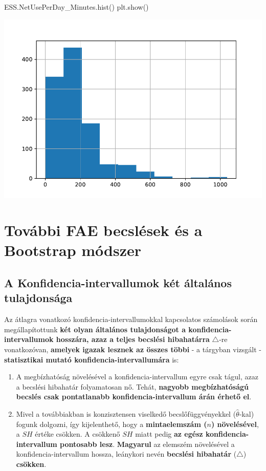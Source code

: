\documentclass[
]{book}
\newenvironment{Shaded}{\begin{snugshade}}{\end{snugshade}}
\newcommand{\NormalTok}[1]{#1}
\providecommand{\tightlist}{%
  \setlength{\itemsep}{0pt}\setlength{\parskip}{0pt}}
\begin{document}
\begin{Shaded}
\begin{Highlighting}[]
\NormalTok{ESS.NetUsePerDay\_Minutes.hist()}
\NormalTok{plt.show()}
\end{Highlighting}
\end{Shaded}

\includegraphics{_main_files/figure-latex/unnamed-chunk-283-13.pdf}

\chapter{További FAE becslések és a Bootstrap módszer}\label{tovuxe1bbi-fae-becsluxe9sek-uxe9s-a-bootstrap-muxf3dszer}

\section{A Konfidencia-intervallumok két általános tulajdonsága}\label{a-konfidencia-intervallumok-kuxe9t-uxe1ltaluxe1nos-tulajdonsuxe1ga}

Az átlagra vonatkozó konfidencia-intervallumokkal kapcsolatos számolások során megállapítottunk \textbf{két olyan általános tulajdonságot a konfidencia-intervallumok hosszára, azaz a teljes becslési hibahatárra} \(\triangle\)-re vonatkozóvan, \textbf{amelyek igazak lesznek az összes többi} - a tárgyban vizsgált - \textbf{statisztikai mutató konfidencia-intervallumára} is:

\begin{enumerate}
\def\labelenumi{\arabic{enumi}.}
\tightlist
\item
  A megbízhatóság növelésével a konfidencia-intervallum egyre csak tágul, azaz a becslési hibahatár folyamatosan nő. Tehát, \textbf{nagyobb megbízhatóságú becslés csak pontatlanabb konfidencia-intervallum árán érhető el}.
\item
  Mivel a továbbiakban is konzisztensen viselkedő becslőfüggvényekkel (\(\hat{\theta}\)-kal) fogunk dolgozni, így kijelenthető, hogy a \textbf{mintaelemszám (\(n\)) növelésével}, a \(SH\) értéke csökken. A csökkenő \(SH\) miatt pedig \textbf{az egész konfidencia-intervallum pontosabb lesz}. \textbf{Magyarul} az elemszém növelésével a konfidencia-intervallum hossza, leánykori nevén \textbf{becslési hibahatár} (\(\triangle\)) \textbf{csökken}.
\end{enumerate}
\end{document}
